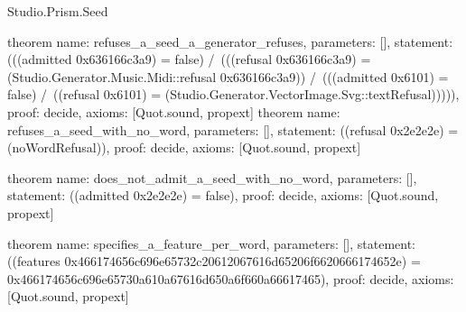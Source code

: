 \begin{lexlean}{Studio.Prism.Seed}
\begin{semanticmodule}
theorem{
  name: refuses_a_seed_a_generator_refuses,
  parameters: [],
  statement: (((admitted 0x636166c3a9) = false) /\ (((refusal 0x636166c3a9) = (Studio.Generator.Music.Midi::refusal 0x636166c3a9)) /\ (((admitted 0x6101) = false) /\ ((refusal 0x6101) = (Studio.Generator.VectorImage.Svg::textRefusal))))),
  proof: decide{},
  axioms: [Quot.sound, propext]
}
theorem{
  name: refuses_a_seed_with_no_word,
  parameters: [],
  statement: ((refusal 0x2e2e2e) = (noWordRefusal)),
  proof: decide{},
  axioms: [Quot.sound, propext]
}

theorem{
  name: does_not_admit_a_seed_with_no_word,
  parameters: [],
  statement: ((admitted 0x2e2e2e) = false),
  proof: decide{},
  axioms: [Quot.sound, propext]
}

theorem{
  name: specifies_a_feature_per_word,
  parameters: [],
  statement: ((features 0x466174656c696e65732c20612067616d65206f6620666174652e) = 0x466174656c696e65730a610a67616d650a6f660a66617465),
  proof: decide{},
  axioms: [Quot.sound, propext]
}
\end{semanticmodule}
\end{lexlean}
